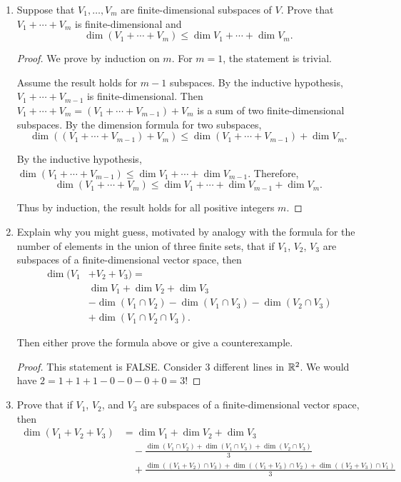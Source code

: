 \begin{enumerate}
            \item[17] Suppose that $V_1, \ldots, V_m$ are finite-dimensional subspaces of $V$. Prove that $V_1 + \cdots + V_m$ is finite-dimensional and 
            \[\dim(V_1 + \cdots + V_m) \leq \dim V_1 + \cdots + \dim V_m.\]
            
            \begin{proof}
                We prove by induction on $m$. For $m = 1$, the statement is trivial. 
                
                Assume the result holds for $m-1$ subspaces. By the inductive hypothesis, $V_1 + \cdots + V_{m-1}$ is finite-dimensional. Then $V_1 + \cdots + V_m = (V_1 + \cdots + V_{m-1}) + V_m$ is a sum of two finite-dimensional subspaces. By the dimension formula for two subspaces,
                \[\dim((V_1 + \cdots + V_{m-1}) + V_m) \leq \dim(V_1 + \cdots + V_{m-1}) + \dim V_m.\]
                
                By the inductive hypothesis, $\dim(V_1 + \cdots + V_{m-1}) \leq \dim V_1 + \cdots + \dim V_{m-1}$. Therefore,
                \[\dim(V_1 + \cdots + V_m) \leq \dim V_1 + \cdots + \dim V_{m-1} + \dim V_m.\]
                
                Thus by induction, the result holds for all positive integers $m$.
            \end{proof}

            \item[19] Explain why you might guess, motivated by analogy with the formula for
the number of elements in the union of three finite sets, that if $V_1$, $V_2$, $V_3$
are subspaces of a finite-dimensional vector space, then
\begin{align*}
\dim(V_1 &+ V_2 + V_3) =  \\
&\dim V_1 + \dim V_2 + \dim V_3 \\
&- \dim(V_1 \cap V_2) - \dim(V_1 \cap V_3) - \dim(V_2 \cap V_3) \\
&+ \dim(V_1 \cap V_2 \cap V_3).
\end{align*}

Then either prove the formula above or give a counterexample.

\begin{proof}
    This statement is FALSE. Consider 3 different lines in $\mathbb{R}^2$. We would have $2 = 1 + 1 + 1 - 0 - 0 - 0 + 0 = 3$!
\end{proof}


\item[20] Prove that if $V_1$, $V_2$, and $V_3$ are subspaces of a finite-dimensional vector space, then
            \begin{align*}
                \dim(V_1 + V_2 + V_3) &= \dim V_1 + \dim V_2 + \dim V_3 \\
                &\quad - \frac{\dim(V_1 \cap V_2) + \dim(V_1 \cap V_3) + \dim(V_2 \cap V_3)}{3} \\
                &\quad + \frac{\dim((V_1 + V_2) \cap V_3) + \dim((V_1 + V_3) \cap V_2) + \dim((V_2 + V_3) \cap V_1)}{3}
            \end{align*}


\end{enumerate}
